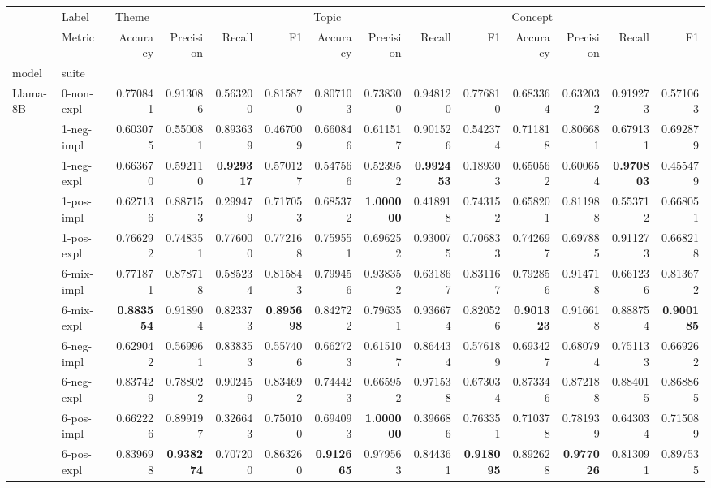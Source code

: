 \begin{tabular}{ll|rrrr|rrrr|rrrr}
 & Label & \multicolumn{4}{l}{Theme} & \multicolumn{4}{l}{Topic} & \multicolumn{4}{l}{Concept} \\
 & Metric & Accuracy & Precision & Recall & F1 & Accuracy & Precision & Recall & F1 & Accuracy & Precision & Recall & F1 \\
model & suite &  &  &  &  &  &  &  &  &  &  &  &  \\
\midrule
\multirow[t]{11}{*}{Llama-8B} & 0-non-expl & 0.770841 & 0.913086 & 0.563200 & 0.815870 & 0.807103 & 0.738300 & 0.948120 & 0.776810 & 0.683364 & 0.632032 & 0.919273 & 0.571063 \\
 & 1-neg-impl & 0.603075 & 0.550081 & 0.893639 & 0.467009 & 0.660846 & 0.611517 & 0.901526 & 0.542374 & 0.711818 & 0.806681 & 0.679131 & 0.692879 \\
 & 1-neg-expl & 0.663670 & 0.592110 & \bfseries 0.929317 & 0.570127 & 0.547566 & 0.523952 & \bfseries 0.992453 & 0.189303 & 0.650562 & 0.600654 & \bfseries 0.970803 & 0.455479 \\
 & 1-pos-impl & 0.627136 & 0.887153 & 0.299479 & 0.717053 & 0.685372 & \bfseries 1.000000 & 0.418918 & 0.743152 & 0.658201 & 0.811988 & 0.553712 & 0.668051 \\
 & 1-pos-expl & 0.766292 & 0.748351 & 0.776000 & 0.772168 & 0.759551 & 0.696252 & 0.930075 & 0.706833 & 0.742697 & 0.697885 & 0.911273 & 0.668218 \\
 & 6-mix-impl & 0.771871 & 0.878718 & 0.585234 & 0.815843 & 0.799456 & 0.938352 & 0.631867 & 0.831167 & 0.792856 & 0.914718 & 0.661236 & 0.813672 \\
 & 6-mix-expl & \bfseries 0.883554 & 0.918904 & 0.823373 & \bfseries 0.895698 & 0.842722 & 0.796351 & 0.936674 & 0.820526 & \bfseries 0.901323 & 0.916618 & 0.888754 & \bfseries 0.900185 \\
 & 6-neg-impl & 0.629042 & 0.569961 & 0.838353 & 0.557406 & 0.662723 & 0.615107 & 0.864434 & 0.576189 & 0.693427 & 0.680794 & 0.751133 & 0.669262 \\
 & 6-neg-expl & 0.837429 & 0.788022 & 0.902459 & 0.834692 & 0.744423 & 0.665952 & 0.971538 & 0.673034 & 0.873346 & 0.872188 & 0.884015 & 0.868865 \\
 & 6-pos-impl & 0.662226 & 0.899197 & 0.326643 & 0.750100 & 0.694093 & \bfseries 1.000000 & 0.396686 & 0.763351 & 0.710378 & 0.781939 & 0.643034 & 0.715089 \\
 & 6-pos-expl & 0.839698 & \bfseries 0.938274 & 0.707200 & 0.863260 & \bfseries 0.912665 & 0.979563 & 0.844361 & \bfseries 0.918095 & 0.892628 & \bfseries 0.977026 & 0.813091 & 0.897535 \\

\end{tabular}
